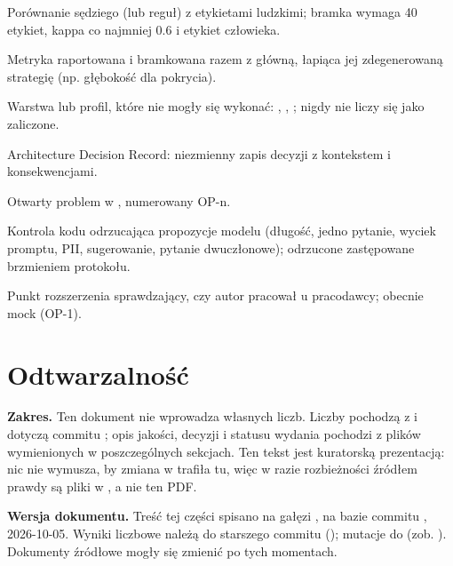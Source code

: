 \begin{description}[leftmargin=!,labelwidth=3.4cm,itemsep=3pt,style=nextline]
  \item[Kalibracja] Porównanie sędziego (lub reguł) z etykietami ludzkimi; bramka wymaga 40 etykiet, kappa co najmniej 0.6 i etykiet człowieka.
  \item[Przeciwwaga (counter-metric)] Metryka raportowana i bramkowana razem z główną, łapiąca jej zdegenerowaną strategię (np. głębokość dla pokrycia).
  \item[Pominięte (skipped)] Warstwa lub profil, które nie mogły się wykonać: , , ; nigdy nie liczy się jako zaliczone.
  \item[ADR] Architecture Decision Record: niezmienny zapis decyzji z kontekstem i konsekwencjami.
  \item[OP] Otwarty problem w , numerowany OP-n.
  \item[Strażnik pytań (QuestionGuard)] Kontrola kodu odrzucająca propozycje modelu (długość, jedno pytanie, wyciek promptu, PII, sugerowanie, pytanie dwuczłonowe); odrzucone zastępowane brzmieniem protokołu.
  \item[Weryfikator zatrudnienia] Punkt rozszerzenia sprawdzający, czy autor pracował u pracodawcy; obecnie mock (OP-1).
\end{description}

\section{Odtwarzalność}
\label{sec:p4-odtwarzalnosc}

\textbf{Zakres.} Ten dokument nie wprowadza własnych liczb. Liczby pochodzą z  i dotyczą commitu ; opis jakości, decyzji i statusu wydania pochodzi z plików wymienionych w poszczególnych sekcjach. Ten tekst jest kuratorską prezentacją: nic nie wymusza, by zmiana w  trafiła tu, więc w razie rozbieżności źródłem prawdy są pliki w , a nie ten PDF.

\textbf{Wersja dokumentu.} Treść tej części spisano na gałęzi , na bazie commitu , 2026-10-05. Wyniki liczbowe należą do starszego commitu (); mutacje do  (zob. ). Dokumenty źródłowe mogły się zmienić po tych momentach.

